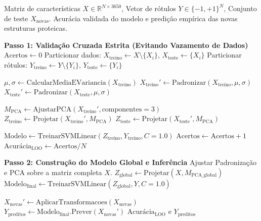 \documentclass[12pt, a4paper]{article}
\theoremstyle{plain}
\theoremstyle{definition}
\theoremstyle{remark}
\begin{document}
\begin{algorithm}[H]
\caption{Validação LOOCV e Treinamento do Classificador Topológico}
\label{alg:ml_pipeline}
\begin{algorithmic}[1]
\Require Matriz de características $X \in \mathbb{R}^{N \times 3650}$, Vetor de rótulos $Y \in \{-1, +1\}^N$, Conjunto de teste $X_{\text{novas}}$.
\Ensure Acurácia validada do modelo e predição empírica das novas estruturas proteicas.

\Statex \textbf{Passo 1: Validação Cruzada Estrita (Evitando Vazamento de Dados)}
\State $\text{Acertos} \leftarrow 0$
    \State Particionar dados: $X_{\text{treino}} \leftarrow X \setminus \{X_i\}$, \quad $X_{\text{teste}} \leftarrow \{X_i\}$
    \State Particionar rótulos: $Y_{\text{treino}} \leftarrow Y \setminus \{Y_i\}$, \quad $Y_{\text{teste}} \leftarrow \{Y_i\}$
    
    \State $\mu, \sigma \leftarrow \text{CalcularMediaEVariancia}(X_{\text{treino}})$
    \State $X_{\text{treino}}' \leftarrow \text{Padronizar}(X_{\text{treino}}, \mu, \sigma)$
    \State $X_{\text{teste}}' \leftarrow \text{Padronizar}(X_{\text{teste}}, \mu, \sigma)$ 
    
    \State $M_{\text{PCA}} \leftarrow \text{AjustarPCA}(X_{\text{treino}}', \text{componentes} = 3)$
    \State $Z_{\text{treino}} \leftarrow \text{Projetar}(X_{\text{treino}}', M_{\text{PCA}})$
    \State $Z_{\text{teste}} \leftarrow \text{Projetar}(X_{\text{teste}}', M_{\text{PCA}})$ 
    
    \State $\text{Modelo} \leftarrow \text{TreinarSVMLinear}(Z_{\text{treino}}, Y_{\text{treino}}, C=1.0)$
        \State $\text{Acertos} \leftarrow \text{Acertos} + 1$
    \EndIf
\EndFor
\State $\text{Acurácia}_{\text{LOO}} \leftarrow \text{Acertos} / N$

\Statex \textbf{Passo 2: Construção do Modelo Global e Inferência}
\State Ajustar Padronização e PCA sobre a matriz completa $X$.
\State $Z_{\text{global}} \leftarrow \text{Projetar}(X, M_{\text{PCA\_global}})$
\State $\text{Modelo}_{\text{final}} \leftarrow \text{TreinarSVMLinear}(Z_{\text{global}}, Y, C=1.0)$

\State $X_{\text{novas}}' \leftarrow \text{AplicarTransformacoes}(X_{\text{novas}})$
\State $Y_{\text{preditos}} \leftarrow \text{Modelo}_{\text{final}}.\text{Prever}(X_{\text{novas}}')$
\State \Return $\text{Acurácia}_{\text{LOO}}$ e $Y_{\text{preditos}}$
\end{algorithmic}
\end{algorithm}
\end{document}
